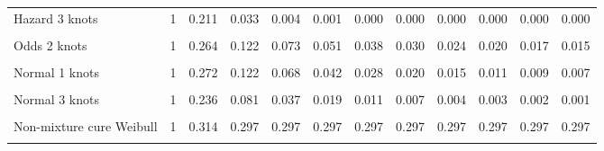 \documentclass[
]{article}
\begin{document}
\begin{table}[H]
{\begin{tabular}[t]{lrrrrrrrrrrr}
Hazard 3 knots & 1 & 0.211 & 0.033 & 0.004 & 0.001 & 0.000 & 0.000 & 0.000 & 0.000 & 0.000 & 0.000\\
\cellcolor{gray!10}{Odds 1 knots} & \cellcolor{gray!10}{1} & \cellcolor{gray!10}{0.285} & \cellcolor{gray!10}{0.145} & \cellcolor{gray!10}{0.093} & \cellcolor{gray!10}{0.067} & \cellcolor{gray!10}{0.052} & \cellcolor{gray!10}{0.042} & \cellcolor{gray!10}{0.035} & \cellcolor{gray!10}{0.030} & \cellcolor{gray!10}{0.026} & \cellcolor{gray!10}{0.023}\\
Odds 2 knots & 1 & 0.264 & 0.122 & 0.073 & 0.051 & 0.038 & 0.030 & 0.024 & 0.020 & 0.017 & 0.015\\
\cellcolor{gray!10}{Odds 3 knots} & \cellcolor{gray!10}{1} & \cellcolor{gray!10}{0.238} & \cellcolor{gray!10}{0.094} & \cellcolor{gray!10}{0.051} & \cellcolor{gray!10}{0.033} & \cellcolor{gray!10}{0.023} & \cellcolor{gray!10}{0.018} & \cellcolor{gray!10}{0.014} & \cellcolor{gray!10}{0.011} & \cellcolor{gray!10}{0.009} & \cellcolor{gray!10}{0.008}\\
Normal 1 knots & 1 & 0.272 & 0.122 & 0.068 & 0.042 & 0.028 & 0.020 & 0.015 & 0.011 & 0.009 & 0.007\\
\cellcolor{gray!10}{Normal 2 knots} & \cellcolor{gray!10}{1} & \cellcolor{gray!10}{0.270} & \cellcolor{gray!10}{0.119} & \cellcolor{gray!10}{0.065} & \cellcolor{gray!10}{0.040} & \cellcolor{gray!10}{0.027} & \cellcolor{gray!10}{0.019} & \cellcolor{gray!10}{0.014} & \cellcolor{gray!10}{0.010} & \cellcolor{gray!10}{0.008} & \cellcolor{gray!10}{0.006}\\
Normal 3 knots & 1 & 0.236 & 0.081 & 0.037 & 0.019 & 0.011 & 0.007 & 0.004 & 0.003 & 0.002 & 0.001\\
\cellcolor{gray!10}{Mixture cure Weibull} & \cellcolor{gray!10}{1} & \cellcolor{gray!10}{0.319} & \cellcolor{gray!10}{0.309} & \cellcolor{gray!10}{0.309} & \cellcolor{gray!10}{0.309} & \cellcolor{gray!10}{0.309} & \cellcolor{gray!10}{0.309} & \cellcolor{gray!10}{0.309} & \cellcolor{gray!10}{0.309} & \cellcolor{gray!10}{0.309} & \cellcolor{gray!10}{0.309}\\
Non-mixture cure Weibull & 1 & 0.314 & 0.297 & 0.297 & 0.297 & 0.297 & 0.297 & 0.297 & 0.297 & 0.297 & 0.297\\
\cellcolor{gray!10}{Mixture cure Log-normal} & \cellcolor{gray!10}{1} & \cellcolor{gray!10}{0.295} & \cellcolor{gray!10}{0.215} & \cellcolor{gray!10}{0.200} & \cellcolor{gray!10}{0.196} & \cellcolor{gray!10}{0.194} & \cellcolor{gray!10}{0.193} & \cellcolor{gray!10}{0.193} & \cellcolor{gray!10}{0.193} & \cellcolor{gray!10}{0.193} & \cellcolor{gray!10}{0.193}\\

\end{tabular}}
\end{table}
\end{document}
